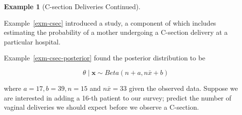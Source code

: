 \documentclass[
  letterpaper,
  DIV=11,
  numbers=noendperiod]{scrreprt}
\theoremstyle{definition}
\newtheorem{example}{Example}[chapter]
\theoremstyle{definition}
\theoremstyle{plain}
\theoremstyle{remark}
\begin{document}
\begin{example}[C-section Deliveries
Continued]\protect\hypertarget{exm-csec-prediction}{}\label{exm-csec-prediction}

Example~\ref{exm-csec} introduced a study, a component of which includes
estimating the probability of a mother undergoing a C-section delivery
at a particular hospital.

Example~\ref{exm-csec-posterior} found the posterior distribution to be

\[\theta \mid \mathbf{x} \sim Beta\left(n + a, n\bar{x} + b\right)\]

where \(a = 17, b = 39, n = 15\) and \(n\bar{x} = 33\) given the
observed data. Suppose we are interested in adding a 16-th patient to
our survey; predict the number of vaginal deliveries we should expect
before we observe a C-section.

\end{example}
\end{document}
